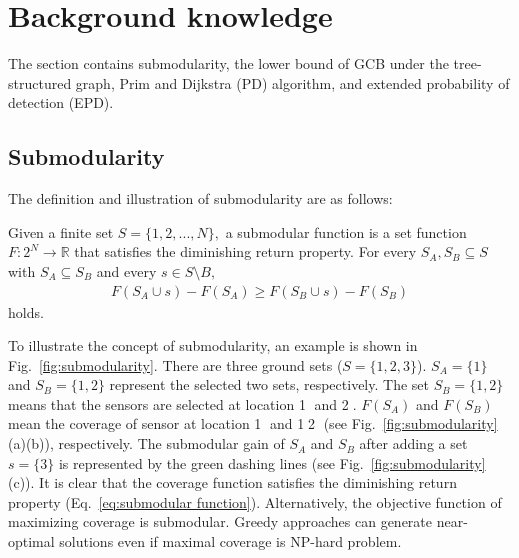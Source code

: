 \chapter{Background knowledge}
The section contains submodularity, the lower bound of GCB under the tree-structured graph, Prim and Dijkstra (PD) algorithm, and extended probability of detection (EPD).

\section{Submodularity}

The definition and illustration of submodularity are as follows:

\begin{definition}
  Given a finite set $S=\{1,2,...,N\},$ a submodular function is a set function $F:2^N \rightarrow \mathbb{R}$ that satisfies the diminishing return property.
For every $S_A, S_B \subseteq S$ with $S_A \subseteq S_B$ and every $s \in S\setminus B,$
\begin{equation}
  \begin{aligned}
    F(S_A\cup s)-F(S_A) \geq F(S_B\cup s)-F(S_B)
  \end{aligned}
  \label{eq:submodular function}
\end{equation}
 holds.
\end{definition}

To illustrate the concept of submodularity, an example is shown in Fig.~\ref{fig:submodularity}. There are three ground sets ($S = \{1, 2, 3\}$).
$S_A=\{1\}$ and $S_B=\{1, 2\}$ represent the selected two sets, respectively. The set $S_B=\{1, 2\}$ means that the sensors are selected at location \textcircled{1} and \textcircled{2}.
$F(S_A)$ and $F(S_B)$ mean the coverage of sensor at location \textcircled{1} and \textcircled{1}\textcircled{2} (see Fig.~\ref{fig:submodularity}(a)(b)), respectively.
The submodular gain of $S_A$ and $S_B$ after adding a set $s = \{3\}$ is represented by the green dashing lines (see Fig.~\ref{fig:submodularity}(c)).
It is clear that the coverage function satisfies the diminishing return property (Eq.~\ref{eq:submodular function}). Alternatively, the objective function of maximizing coverage is submodular.
Greedy approaches can generate near-optimal solutions even if maximal coverage is NP-hard problem.

